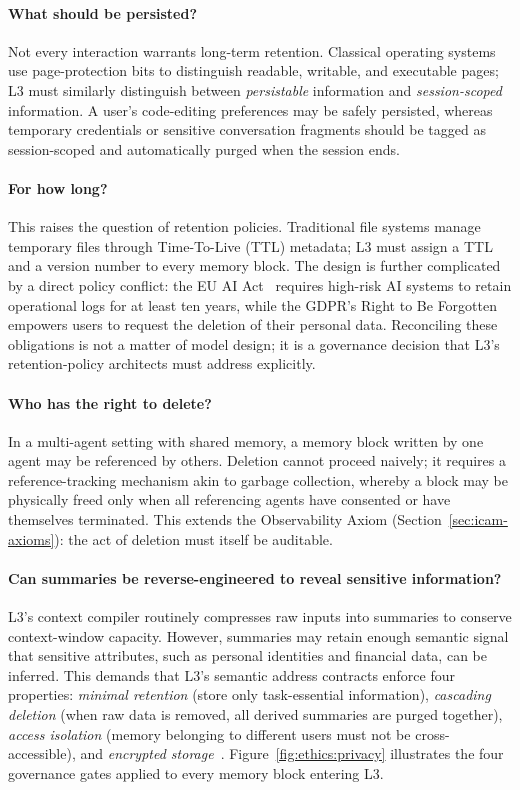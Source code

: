 \paragraph{What should be persisted?}
Not every interaction warrants long-term retention.  Classical operating systems use page-protection bits to distinguish readable, writable, and executable pages; L3 must similarly distinguish between \emph{persistable} information and \emph{session-scoped} information.  A user's code-editing preferences may be safely persisted, whereas temporary credentials or sensitive conversation fragments should be tagged as session-scoped and automatically purged when the session ends.

\paragraph{For how long?}
This raises the question of retention policies.  Traditional file systems manage temporary files through Time-To-Live (TTL) metadata; L3 must assign a TTL and a version number to every memory block.  The design is further complicated by a direct policy conflict: the EU AI Act~\cite{euaiact2026} requires high-risk AI systems to retain operational logs for at least ten years, while the GDPR's Right to Be Forgotten~\cite{gdpr_righttoforget} empowers users to request the deletion of their personal data.  Reconciling these obligations is not a matter of model design; it is a governance decision that L3's retention-policy architects must address explicitly.

\paragraph{Who has the right to delete?}
In a multi-agent setting with shared memory, a memory block written by one agent may be referenced by others.  Deletion cannot proceed naively; it requires a reference-tracking mechanism akin to garbage collection, whereby a block may be physically freed only when all referencing agents have consented or have themselves terminated.  This extends the Observability Axiom (Section~\ref{sec:icam-axioms}): the act of deletion must itself be auditable.

\paragraph{Can summaries be reverse-engineered to reveal sensitive information?}
L3's context compiler routinely compresses raw inputs into summaries to conserve context-window capacity.  However, summaries may retain enough semantic signal that sensitive attributes, such as personal identities and financial data, can be inferred.  This demands that L3's semantic address contracts enforce four properties: \emph{minimal retention} (store only task-essential information), \emph{cascading deletion} (when raw data is removed, all derived summaries are purged together), \emph{access isolation} (memory belonging to different users must not be cross-accessible), and \emph{encrypted storage}~\cite{longmemeval2024,navaie2025privacy}.
Figure~\ref{fig:ethics:privacy} illustrates the four governance gates applied to every memory block entering L3.


